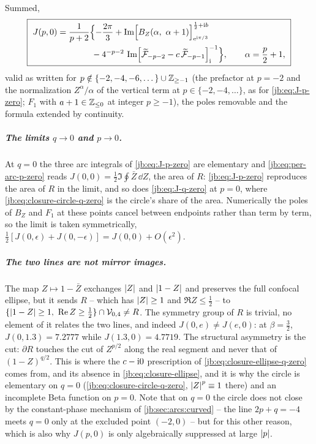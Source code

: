 Summed,
\begin{equation}
  \label{jb:eq:J-q-zero}
  \boxed{\
  \begin{aligned}
    J(p, 0)
      &
      = \frac{1}{p + 2} \Bigl\{
        - \frac{2 \pi}{3}
        + \operatorname{Im} \Bigl[ B_Z (\alpha, \ \alpha + 1) \Bigr]_{\mathrm{e}^{\mathrm{i} \pi/3}}^{\frac12 + \mathrm{i} b}
      \\
      &
      \qquad\qquad
        - 4^{-p - 2} \, \operatorname{Im} \Bigl[ \widetilde{{\mathcal{F}}}_{-p - 2} - c \, \widetilde{{\mathcal{F}}}_{-p - 1} \Bigr]_{\mathrm{i}}^{-1}
      \Bigr\},
    \qquad
    \alpha
      = \frac{p}{2} + 1,
  \end{aligned}
  \ }
\end{equation}
valid as written for $p \notin \{ -2, -4, -6, \dots \} \cup \mathbb{Z}_{\ge -1}$ (the prefactor at $p = -2$
and the normalization $Z^{\alpha} / \alpha$ of the vertical term at $p \in \{ -2, -4, \dots \}$, as for
\eqref{jb:eq:J-p-zero}; $F_1$ with $a + 1 \in \mathbb{Z}_{\le 0}$ at integer $p \ge -1$), the poles removable and
the formula extended by continuity.

\subparagraph{The limits $q \to 0$ and $p \to 0$.}
At $q = 0$ the three arc integrals of \eqref{jb:eq:J-p-zero} are elementary and
\eqref{jb:eq:per-arc-p-zero} reads $J(0, 0) = \tfrac12 \Im \oint \bar Z \, \dd Z$, the area of $R$:
\eqref{jb:eq:J-p-zero} reproduces the area of $R$ in the limit, and so does \eqref{jb:eq:J-q-zero} at
$p = 0$, where \eqref{jb:eq:closure-circle-q-zero} is the circle's share of the area.
Numerically the poles of $B_Z$ and $F_1$ at these points cancel between endpoints rather than
term by term, so the limit is taken symmetrically, $\tfrac12 [J(0, \epsilon) + J(0, - \epsilon)]
= J(0, 0) + O(\epsilon^2)$.

\subparagraph{The two lines are not mirror images.}
The map $Z \mapsto 1 - \bar Z$ exchanges ${|Z|}$ and ${|1 - Z|}$ and preserves the full
confocal ellipse, but it sends $R$ -- which has ${|Z|} \ge 1$ and $\Re Z \le \tfrac12$ -- to
$\{ {|1 - Z|} \ge 1, \ \operatorname{Re} Z \ge \tfrac12 \} \cap {\mathcal{V}}_{0,4} \ne R$.
The symmetry group of $R$ is trivial, no element of it relates the two lines, and indeed
$J(0, e) \ne J(e, 0)$: at $\beta = \tfrac32$, $J(0, 1.3) = 7.2777$ while $J(1.3, 0) = 4.7719$.
The structural asymmetry is the cut: $\partial R$ touches the cut of $Z^{p/2}$ along the real
segment and never that of $(1 - Z)^{q/2}$.
This is where the $c - \mathrm{i} 0$ prescription of \eqref{jb:eq:closure-ellipse-q-zero} comes from, and its
absence in \eqref{jb:eq:closure-ellipse}, and it is why the circle is elementary on $q = 0$
(\eqref{jb:eq:closure-circle-q-zero}, ${|Z|}^p \equiv 1$ there) and an incomplete Beta function on
$p = 0$.
Note that on $q = 0$ the circle does not close by the constant-phase mechanism of
\cref{jb:sec:arcs:curved} -- the line $2p + q = -4$ meets $q = 0$ only at the excluded point
$(-2, 0)$ -- but for this other reason, which is also why $J(p, 0)$ is only algebraically
suppressed at large ${|p|}$.

